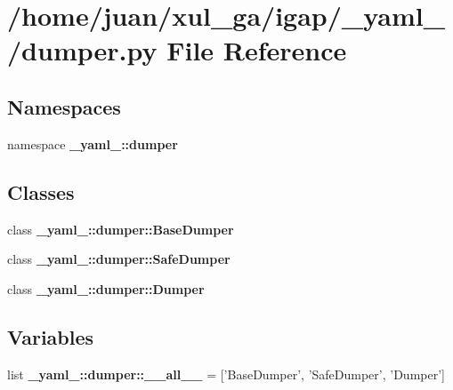 \section{/home/juan/xul\_\-ga/igap/\_\-yaml\_\-/dumper.py File Reference}
\label{dumper_8py}
\subsection*{Namespaces}
\begin{CompactItemize}
\item 
namespace {\bf \_\-yaml\_\-::dumper}
\end{CompactItemize}
\subsection*{Classes}
\begin{CompactItemize}
\item 
class {\bf \_\-yaml\_\-::dumper::BaseDumper}
\item 
class {\bf \_\-yaml\_\-::dumper::SafeDumper}
\item 
class {\bf \_\-yaml\_\-::dumper::Dumper}
\end{CompactItemize}
\subsection*{Variables}
\begin{CompactItemize}
\item 
list {\bf \_\-yaml\_\-::dumper::\_\-\_\-all\_\-\_\-} = ['BaseDumper', 'SafeDumper', 'Dumper']
\end{CompactItemize}
